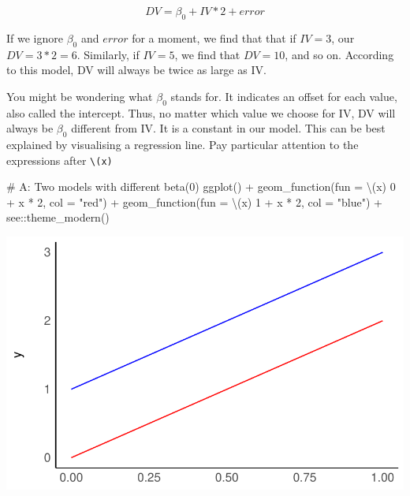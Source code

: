 \documentclass[
  letterpaper,
  DIV=11,
  numbers=noendperiod]{scrreprt}
\newenvironment{Shaded}{\begin{snugshade}}{\end{snugshade}}
\newcommand{\AttributeTok}[1]{\textcolor[rgb]{0.40,0.45,0.13}{#1}}
\newcommand{\CommentTok}[1]{\textcolor[rgb]{0.37,0.37,0.37}{#1}}
\newcommand{\DecValTok}[1]{\textcolor[rgb]{0.68,0.00,0.00}{#1}}
\newcommand{\FunctionTok}[1]{\textcolor[rgb]{0.28,0.35,0.67}{#1}}
\newcommand{\NormalTok}[1]{\textcolor[rgb]{0.00,0.23,0.31}{#1}}
\newcommand{\SpecialCharTok}[1]{\textcolor[rgb]{0.37,0.37,0.37}{#1}}
\newcommand{\StringTok}[1]{\textcolor[rgb]{0.13,0.47,0.30}{#1}}
\begin{document}
\label{single-linear-regression-example}
\[
DV = \beta_0 + IV * 2 + error
\]

If we ignore \(\beta_0\) and \(error\) for a moment, we find that that
if \(IV = 3\), our \(DV = 3*2 = 6\). Similarly, if \(IV = 5\), we find
that \(DV = 10\), and so on. According to this model, DV will always be
twice as large as IV.

You might be wondering what \(\beta_0\) stands for. It indicates an
offset for each value, also called the intercept. Thus, no matter which
value we choose for IV, DV will always be \(\beta_0\) different from IV.
It is a constant in our model. This can be best explained by visualising
a regression line. Pay particular attention to the expressions after
\texttt{\textbackslash{}(x)}

\begin{Shaded}
\begin{Highlighting}[]
\CommentTok{\# A: Two models with different beta(0)}
\FunctionTok{ggplot}\NormalTok{() }\SpecialCharTok{+}
  \FunctionTok{geom\_function}\NormalTok{(}\AttributeTok{fun =}\NormalTok{ \textbackslash{}(x) }\DecValTok{0} \SpecialCharTok{+}\NormalTok{ x }\SpecialCharTok{*} \DecValTok{2}\NormalTok{, }\AttributeTok{col =} \StringTok{"red"}\NormalTok{) }\SpecialCharTok{+}
  \FunctionTok{geom\_function}\NormalTok{(}\AttributeTok{fun =}\NormalTok{ \textbackslash{}(x) }\DecValTok{1} \SpecialCharTok{+}\NormalTok{ x }\SpecialCharTok{*} \DecValTok{2}\NormalTok{, }\AttributeTok{col =} \StringTok{"blue"}\NormalTok{) }\SpecialCharTok{+}
\NormalTok{  see}\SpecialCharTok{::}\FunctionTok{theme\_modern}\NormalTok{()  }
\end{Highlighting}
\end{Shaded}

\includegraphics{13_regressions_files/figure-latex/beta-zero-beta-one-explained-1.pdf}
\end{document}
